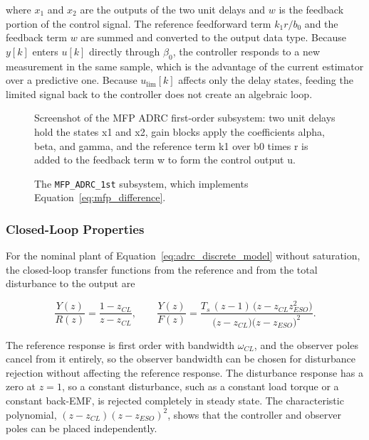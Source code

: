 where $x_1$ and $x_2$ are the outputs of the two unit delays and $w$ is the feedback portion of the control signal. The reference feedforward term $k_1 r / b_0$ and the feedback term $w$ are summed and converted to the output data type. Because $y[k]$ enters $u[k]$ directly through $\beta_0$, the controller responds to a new measurement in the same sample, which is the advantage of the current estimator over a predictive one. Because $u_{\mathrm{lim}}[k]$ affects only the delay states, feeding the limited signal back to the controller does not create an algebraic loop.
\begin{figure}[htbp]
	\centering
		{Screenshot of the MFP ADRC first-order subsystem: two unit delays hold the states x1 and x2, gain blocks apply the coefficients alpha, beta, and gamma, and the reference term k1 over b0 times r is added to the feedback term w to form the control output u.}
	\caption[The \texttt{MFP\_ADRC\_1st} subsystem]{The \texttt{MFP\_ADRC\_1st} subsystem, which implements Equation~\eqref{eq:mfp_difference}.}
	\label{fig:mfp_adrc}
\end{figure}

\subsubsection{Closed-Loop Properties}

For the nominal plant of Equation~\eqref{eq:adrc_discrete_model} without saturation, the closed-loop transfer functions from the reference and from the total disturbance to the output are

\begin{equation}
	\frac{Y(z)}{R(z)} = \frac{1 - z_{CL}}{z - z_{CL}},
	\qquad
	\frac{Y(z)}{F(z)} = \frac{T_s\,(z - 1)\,\big( z - z_{CL} z_{ESO}^{2} \big)}
	{\big( z - z_{CL} \big)\big( z - z_{ESO} \big)^{2}}.
	\label{eq:adrc_closed_loop}
\end{equation}

The reference response is first order with bandwidth $\omega_{CL}$,
and the observer poles cancel from it entirely, so the observer bandwidth can be chosen for disturbance rejection without affecting the reference response. The disturbance response has a zero at $z = 1$, so a constant disturbance, such as a constant load torque or a constant back-EMF, is rejected completely in steady state. The characteristic polynomial, $(z - z_{CL})(z - z_{ESO})^{2}$, shows that the controller and observer poles can be placed independently.

